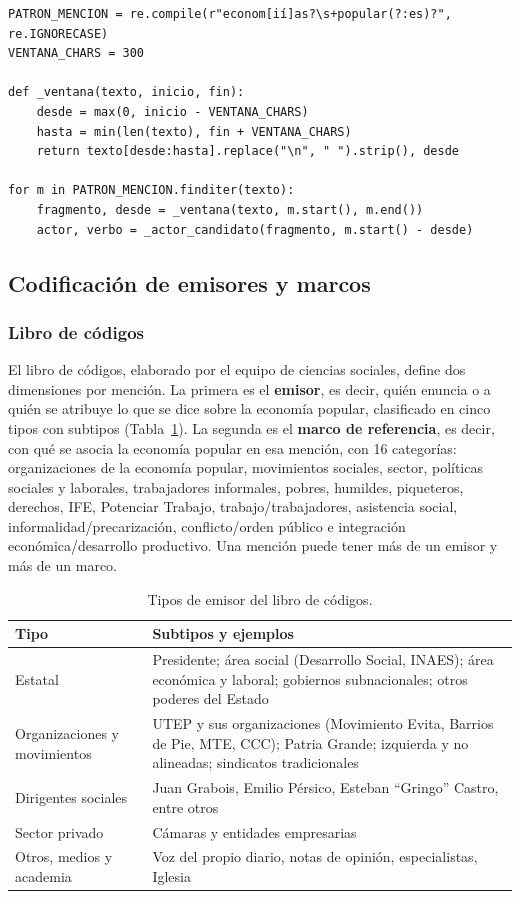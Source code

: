 \documentclass[11pt,a4paper]{article}
\newcommand{\EP}{economía popular}
\begin{document}
\begin{lstlisting}[caption={Detección de menciones y recorte del contexto (\texttt{extraer\_fragmentos.py}).}, label=cod:menciones]
PATRON_MENCION = re.compile(r"econom[ií]as?\s+popular(?:es)?", re.IGNORECASE)
VENTANA_CHARS = 300

def _ventana(texto, inicio, fin):
    desde = max(0, inicio - VENTANA_CHARS)
    hasta = min(len(texto), fin + VENTANA_CHARS)
    return texto[desde:hasta].replace("\n", " ").strip(), desde

for m in PATRON_MENCION.finditer(texto):
    fragmento, desde = _ventana(texto, m.start(), m.end())
    actor, verbo = _actor_candidato(fragmento, m.start() - desde)
\end{lstlisting}

\subsection{Codificación de emisores y marcos}

\subsubsection{Libro de códigos}

El libro de códigos, elaborado por el equipo de ciencias sociales, define dos dimensiones por mención. La primera es el \textbf{emisor}, es decir, quién enuncia o a quién se atribuye lo que se dice sobre la \EP{}, clasificado en cinco tipos con subtipos (Tabla~\ref{tab:codebook}). La segunda es el \textbf{marco de referencia}, es decir, con qué se asocia la \EP{} en esa mención, con 16 categorías: organizaciones de la economía popular, movimientos sociales, sector, políticas sociales y laborales, trabajadores informales, pobres, humildes, piqueteros, derechos, IFE, Potenciar Trabajo, trabajo/trabajadores, asistencia social, informalidad/precarización, conflicto/orden público e integración económica/desarrollo productivo. Una mención puede tener más de un emisor y más de un marco.

\begin{table}[h]
\centering\small
\caption{Tipos de emisor del libro de códigos.}
\label{tab:codebook}
\begin{tabularx}{\linewidth}{>{\raggedright}p{4.3cm} X}
\toprule
\textbf{Tipo} & \textbf{Subtipos y ejemplos} \\
\midrule
Estatal & Presidente; área social (Desarrollo Social, INAES); área económica y laboral; gobiernos subnacionales; otros poderes del Estado \\
Organizaciones y movimientos & UTEP y sus organizaciones (Movimiento Evita, Barrios de Pie, MTE, CCC); Patria Grande; izquierda y no alineadas; sindicatos tradicionales \\
Dirigentes sociales & Juan Grabois, Emilio Pérsico, Esteban \enquote{Gringo} Castro, entre otros \\
Sector privado & Cámaras y entidades empresarias \\
Otros, medios y academia & Voz del propio diario, notas de opinión, especialistas, Iglesia \\
\bottomrule
\end{tabularx}
\end{table}
\end{document}
